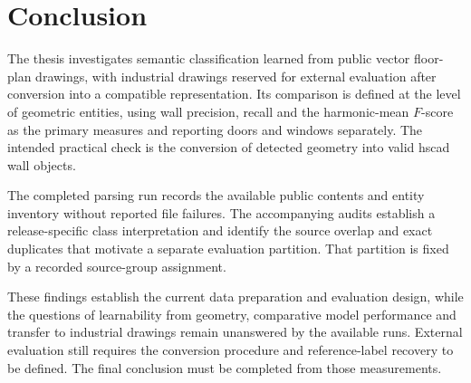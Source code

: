 \chapter{Conclusion}
\label{ch:conclusion}

The thesis investigates semantic classification learned from public vector
floor-plan drawings, with industrial drawings reserved for external evaluation
after conversion into a compatible representation.
Its comparison is defined at the level of geometric entities, using wall
precision, recall and the harmonic-mean \(F\)-score as the primary measures and
reporting doors and windows separately.
The intended practical check is the conversion of detected geometry into valid
\gls{hscad} wall objects.

The completed parsing run records the available public contents and entity
inventory without reported file failures.
The accompanying audits establish a release-specific class interpretation and
identify the source overlap and exact duplicates that motivate a separate
evaluation partition.
That partition is fixed by a recorded source-group assignment.

These findings establish the current data preparation and evaluation design,
while the questions of learnability from geometry, comparative model performance
and transfer to industrial drawings remain unanswered by the available runs.
External evaluation still requires the conversion procedure and reference-label
recovery to be defined.
The final conclusion must be completed from those measurements.

